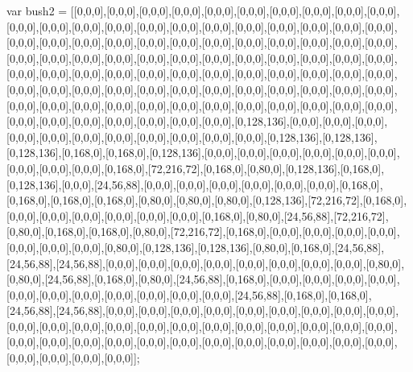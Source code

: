var bush2 = [[0,0,0],[0,0,0],[0,0,0],[0,0,0],[0,0,0],[0,0,0],[0,0,0],[0,0,0],[0,0,0],[0,0,0],[0,0,0],[0,0,0],[0,0,0],[0,0,0],[0,0,0],[0,0,0],[0,0,0],[0,0,0],[0,0,0],[0,0,0],[0,0,0],[0,0,0],[0,0,0],[0,0,0],[0,0,0],[0,0,0],[0,0,0],[0,0,0],[0,0,0],[0,0,0],[0,0,0],[0,0,0],[0,0,0],[0,0,0],[0,0,0],[0,0,0],[0,0,0],[0,0,0],[0,0,0],[0,0,0],[0,0,0],[0,0,0],[0,0,0],[0,0,0],[0,0,0],[0,0,0],[0,0,0],[0,0,0],[0,0,0],[0,0,0],[0,0,0],[0,0,0],[0,0,0],[0,0,0],[0,0,0],[0,0,0],[0,0,0],[0,0,0],[0,0,0],[0,0,0],[0,0,0],[0,0,0],[0,0,0],[0,0,0],[0,0,0],[0,0,0],[0,0,0],[0,0,0],[0,0,0],[0,0,0],[0,0,0],[0,0,0],[0,0,0],[0,0,0],[0,0,0],[0,0,0],[0,0,0],[0,0,0],[0,0,0],[0,0,0],[0,0,0],[0,0,0],[0,0,0],[0,0,0],[0,0,0],[0,0,0],[0,0,0],[0,0,0],[0,0,0],[0,128,136],[0,0,0],[0,0,0],[0,0,0],[0,0,0],[0,0,0],[0,0,0],[0,0,0],[0,0,0],[0,0,0],[0,0,0],[0,0,0],[0,128,136],[0,128,136],[0,128,136],[0,168,0],[0,168,0],[0,128,136],[0,0,0],[0,0,0],[0,0,0],[0,0,0],[0,0,0],[0,0,0],[0,0,0],[0,0,0],[0,0,0],[0,168,0],[72,216,72],[0,168,0],[0,80,0],[0,128,136],[0,168,0],[0,128,136],[0,0,0],[24,56,88],[0,0,0],[0,0,0],[0,0,0],[0,0,0],[0,0,0],[0,0,0],[0,168,0],[0,168,0],[0,168,0],[0,168,0],[0,80,0],[0,80,0],[0,80,0],[0,128,136],[72,216,72],[0,168,0],[0,0,0],[0,0,0],[0,0,0],[0,0,0],[0,0,0],[0,0,0],[0,168,0],[0,80,0],[24,56,88],[72,216,72],[0,80,0],[0,168,0],[0,168,0],[0,80,0],[72,216,72],[0,168,0],[0,0,0],[0,0,0],[0,0,0],[0,0,0],[0,0,0],[0,0,0],[0,0,0],[0,80,0],[0,128,136],[0,128,136],[0,80,0],[0,168,0],[24,56,88],[24,56,88],[24,56,88],[0,0,0],[0,0,0],[0,0,0],[0,0,0],[0,0,0],[0,0,0],[0,0,0],[0,0,0],[0,80,0],[0,80,0],[24,56,88],[0,168,0],[0,80,0],[24,56,88],[0,168,0],[0,0,0],[0,0,0],[0,0,0],[0,0,0],[0,0,0],[0,0,0],[0,0,0],[0,0,0],[0,0,0],[0,0,0],[0,0,0],[24,56,88],[0,168,0],[0,168,0],[24,56,88],[24,56,88],[0,0,0],[0,0,0],[0,0,0],[0,0,0],[0,0,0],[0,0,0],[0,0,0],[0,0,0],[0,0,0],[0,0,0],[0,0,0],[0,0,0],[0,0,0],[0,0,0],[0,0,0],[0,0,0],[0,0,0],[0,0,0],[0,0,0],[0,0,0],[0,0,0],[0,0,0],[0,0,0],[0,0,0],[0,0,0],[0,0,0],[0,0,0],[0,0,0],[0,0,0],[0,0,0],[0,0,0],[0,0,0],[0,0,0],[0,0,0],[0,0,0],[0,0,0],[0,0,0]];


